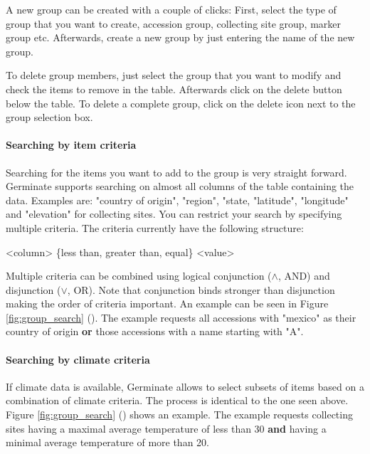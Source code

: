 A new group can be created with a couple of clicks: First, select the type of group that you want to create, \eg accession group, collecting site group, marker group etc. Afterwards, create a new group by just entering the name of the new group.

To delete group members, just select the group that you want to modify and check the items to remove in the table. Afterwards click on the delete button below the table. To delete a complete group, click on the delete icon next to the group selection box.

\paragraph{Searching by item criteria}
Searching for the items you want to add to the group is very straight forward. Germinate supports searching on almost all columns of the table containing the data. Examples are: "country of origin", "region", "state, "latitude", "longitude" and "elevation" for collecting sites. You can restrict your search by specifying multiple criteria. The criteria currently have the following structure:
\begin{center}
    <column> \{less than, greater than, equal\} <value>
\end{center}
\noindent
Multiple criteria can be combined using logical conjunction ($\land$, AND) and disjunction ($\lor$, OR). Note that conjunction binds stronger than disjunction making the order of criteria important. An example can be seen in Figure \ref{fig:group_search} (). The example requests all accessions with "mexico" as their country of origin \textbf{or} those accessions with a name starting with "A".

\paragraph{Searching by climate criteria}
If climate data is available, Germinate allows to select subsets of items based on a combination of climate criteria. The process is identical to the one seen above. Figure \ref{fig:group_search} () shows an example. The example requests collecting sites having a maximal average temperature of less than 30 \textbf{and} having a minimal average temperature of more than 20.


